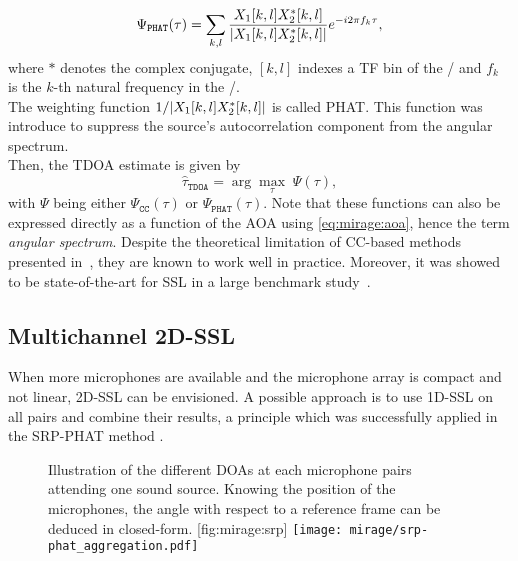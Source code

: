 \begin{equation}\label{eq:mirage:gccphat}
    \Psi_\mathtt{PHAT}(\tau) = \sum_{k,l}\frac{\MIC_1[k,l] \MIC_2^{*}[k,l]}{\kvbar{ \MIC_1[k,l] \MIC_2^{*}[k,l] }} \cste^{-\csti 2  \pi f_k \tau}
    ,
\end{equation}
where $*$ denotes the complex conjugate, $[k,l]$ indexes a \ac{TF} bin of the \STFT/ and $f_k$ is the $k$-th natural frequency in the \STFT/.
\\The weighting function $1 / \kvbar{ \MIC_1[k,l] \MIC_2^{*}[k,l]}$ is called \acf{PHAT}.
This function was introduce to suppress the source's autocorrelation component from the angular spectrum.
\\Then, the \ac{TDOA} estimate is given by
\begin{equation*}
    \hat{\tau}_\mathtt{TDOA} = \arg \underset{\tau}{\max} \; \Psi(\tau)
    ,
\end{equation*}
with $\Psi$ being either $\Psi_\mathtt{CC}(\tau)$ or $\Psi_\mathtt{PHAT}(\tau)$.
Note that these functions can also be expressed directly as a function of the \ac{AOA} using \eqref{eq:mirage:aoa}, hence the term \textit{angular spectrum}.
Despite the theoretical limitation of \ac{CC}-based methods presented in~, they are known to work well in practice.
Moreover, it was showed to be state-of-the-art for \ac{SSL} in a large benchmark study~.

\subsection{Multichannel 2D-SSL}\label{subsec:mirage:2D-SSL}
When more microphones are available and the microphone array is compact and not linear, 2D-\ac{SSL} can be envisioned.
A possible approach is to use 1D-\ac{SSL} on all pairs and combine their results, a principle which was successfully applied in the \acf{SRP-PHAT} method .

\begin{figure}
    \begin{sidecaption}[t]{
        Illustration of the different \acp{DOA} at each microphone pairs attending one sound source.
        Knowing the position of the microphones, the angle with respect to a reference frame can be deduced in closed-form.
    }[fig:mirage:srp]
    \texttt{[image: mirage/srp-phat\_aggregation.pdf]}
\end{sidecaption}
\end{figure}

